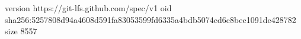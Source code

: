 version https://git-lfs.github.com/spec/v1
oid sha256:5257808d94a4608d591fa83053599fd6335a4bdb5074cd6c8bec1091de428782
size 8557
